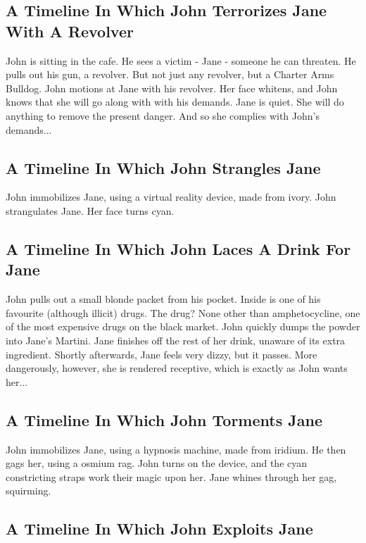\documentclass{article}
\begin{document}
\subsection{A Timeline In Which John Terrorizes Jane With A Revolver}


John is sitting in the cafe.
He sees a victim {-} Jane {-} someone he can threaten. He pulls out his gun, a revolver.
But not just any revolver, but a Charter Arms Bulldog.
John motions at Jane with his revolver. Her face whitens, and John knows that she will go along with with his demands.
Jane is quiet. She will do anything to remove the present danger. And so she complies with John's demands...
\subsection{A Timeline In Which John Strangles Jane}


John immobilizes Jane, using a virtual reality device, made from ivory.
John strangulates Jane.
Her face turns cyan.
\subsection{A Timeline In Which John Laces A Drink For Jane}


John pulls out a small blonde packet from his pocket. Inside is one of his favourite (although illicit) drugs.
The drug? None other than amphetocycline, one of the most expensive drugs on the black market.
John quickly dumps the powder into Jane's Martini.
Jane finishes off the rest of her drink, unaware of its extra ingredient.
Shortly afterwards, Jane feels very dizzy, but it passes.
More dangerously, however, she is rendered receptive, which is exactly as John wants her...
\subsection{A Timeline In Which John Torments Jane}


John immobilizes Jane, using a hypnosis machine, made from iridium.
He then gags her, using a osmium rag.
John turns on the device, and the cyan constricting straps work their magic upon her.
Jane whines through her gag, squirming.
\subsection{A Timeline In Which John Exploits Jane}
\end{document}

